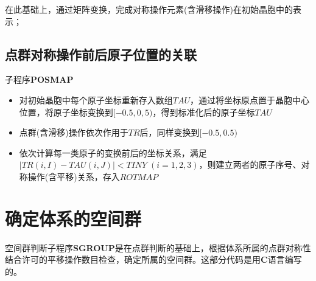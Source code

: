 在此基础上，通过矩阵变换，完成对称操作元素(含滑移操作)在初始晶胞中的表示；
\subsection{点群对称操作前后原子位置的关联}
子程序\textbf{POSMAP}\\
\begin{itemize}
	\item 对初始晶胞中每个原子坐标重新存入数组$\mathit{TAU}$，通过将坐标原点置于晶胞中心位置，将原子坐标变换到$[-0.5,0,5)$，得到标准化后的原子坐标$\mathit{TAU}$
		\item 点群(含滑移)操作依次作用于$\mathit{TR}$后，同样变换到$[-0.5,0.5)$
		\item 依次计算每一类原子的变换前后的坐标关系，满足$|\mathit{TR}(i,I)-\mathit{TAU}(i,J)|<\mathit{TINY}\;(i=1,2,3)$，则建立两者的原子序号、对称操作(含平移)关系，存入$\mathit{ROTMAP}$
\end{itemize}

\section{确定体系的空间群}
空间群判断子程序\textbf{SGROUP}是在点群判断的基础上，根据体系所属的点群对称性结合许可的平移操作数目检查，确定所属的空间群。这部分代码是用\textbf{C}语言编写的。
